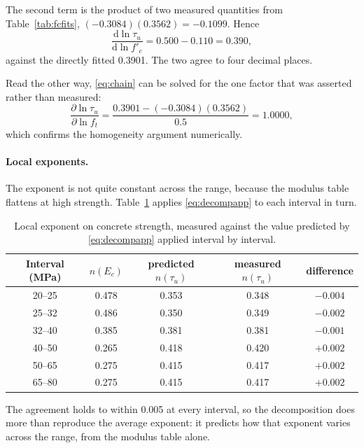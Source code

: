 The second term is the product of two measured quantities from
Table~\ref{tab:fcfits}, $(-0.3084)(0.3562) = -0.1099$. Hence
\begin{equation}
\label{eq:decompapp}
\frac{\mathrm{d}\ln \tau_u}{\mathrm{d}\ln f'_c}
  = 0.500 - 0.110 = 0.390 ,
\end{equation}
against the directly fitted \num{0.3901}. The two agree to four decimal
places.

Read the other way, \eqref{eq:chain} can be solved for the one factor that
was asserted rather than measured:
\begin{equation}
\frac{\partial \ln \tau_u}{\partial \ln f_t}
  = \frac{0.3901 - (-0.3084)(0.3562)}{0.5} = 1.0000 ,
\end{equation}
which confirms the homogeneity argument numerically.

\paragraph{Local exponents.}
The exponent is not quite constant across the range, because the modulus
table flattens at high strength. Table~\ref{tab:fcdrift} applies
\eqref{eq:decompapp} to each interval in turn.

\begin{table}[H]
\centering
\caption{Local exponent on concrete strength, measured against the value
         predicted by \eqref{eq:decompapp} applied interval by interval.}
\label{tab:fcdrift}
\small
\begin{tabular*}{\linewidth}{@{\extracolsep{\fill}}ccccc@{}}
\hline
Interval (MPa) & $n(E_c)$ & predicted $n(\tau_u)$ & measured $n(\tau_u)$
               & difference \\
\hline
20--25 & 0.478 & 0.353 & 0.348 & $-0.004$ \\
25--32 & 0.486 & 0.350 & 0.349 & $-0.002$ \\
32--40 & 0.385 & 0.381 & 0.381 & $-0.001$ \\
40--50 & 0.265 & 0.418 & 0.420 & $+0.002$ \\
50--65 & 0.275 & 0.415 & 0.417 & $+0.002$ \\
65--80 & 0.275 & 0.415 & 0.417 & $+0.002$ \\
\hline
\end{tabular*}
\end{table}

The agreement holds to within \num{0.005} at every interval, so the
decomposition does more than reproduce the average exponent: it predicts
how that exponent varies across the range, from the modulus table alone.

